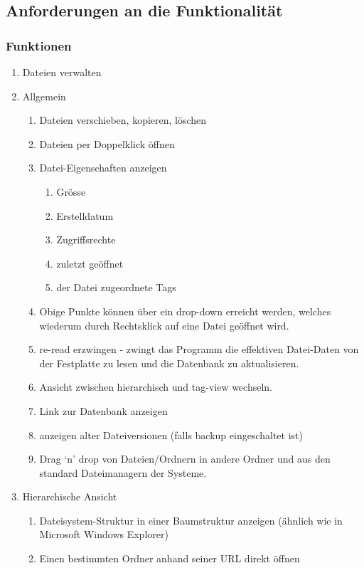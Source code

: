 \documentclass[10pt,paper=a4,final]{scrartcl}
\begin{document}
\subsection{Anforderungen an die Funktionalität}

\subsubsection{Funktionen}
\begin{enumerate}
	\item Dateien verwalten
	\item Allgemein
	\begin{enumerate}
		\item Dateien verschieben, kopieren, löschen
		\item Dateien per Doppelklick \"offnen
		\item Datei-Eigenschaften anzeigen
		\begin{enumerate}
			\item Gr\"osse
			\item Erstelldatum
			\item Zugriffsrechte
			\item zuletzt ge\"offnet
			\item der Datei zugeordnete Tags
		\end{enumerate}
		\item Obige Punkte k\"onnen \"uber ein drop-down erreicht werden, welches wiederum durch Rechtsklick auf eine Datei ge\"offnet wird.
		\item re-read erzwingen - zwingt das Programm die effektiven Datei-Daten von der Festplatte zu lesen und die Datenbank zu aktualisieren.
		\item Ansicht zwischen hierarchisch und tag-view wechseln.
		\item Link zur Datenbank anzeigen
		\item anzeigen alter Dateiversionen (falls backup eingeschaltet ist)
		\item Drag ‘n’ drop von Dateien/Ordnern in andere Ordner und aus den standard Dateimanagern der Systeme.
	\end{enumerate}
	\item Hierarchische Ansicht
	\begin{enumerate}
		\item Dateisystem-Struktur in einer Baumstruktur anzeigen (\"ahnlich wie in Microsoft Windows Explorer)
		\item Einen bestimmten Ordner anhand seiner URL direkt \"offnen
	\end{enumerate}

\end{enumerate}
\end{document}
